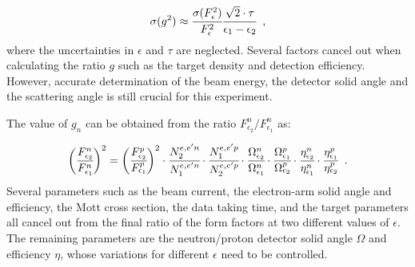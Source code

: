 \documentclass[11pt]{article}
\begin{document}
\begin{equation}
\sigma (g^2) \approx \cfrac{\sigma (F_{\epsilon}^2)}{F_{\epsilon}^2} \cfrac{\sqrt{2} \cdot \tau}{\epsilon_1 - \epsilon_2} \;\; ,
\end{equation}
where the uncertainties in $\epsilon$ and $\tau$ are neglected. Several factors cancel out when calculating the ratio $g$ such as the target density and detection efficiency. However, accurate determination of the beam energy, the detector solid angle and the scattering angle is still crucial for this experiment. \par
The value of $g_n$ can be obtained from the ratio $F_{\epsilon_2}^n/F_{\epsilon_1}^n$  as:

\begin{equation}
\bigg(\cfrac{F_{\epsilon_2}^n}{F_{\epsilon_1}^n}\bigg)^2 = \bigg(\cfrac{F_{\epsilon_2}^p}{F_{\epsilon_1}^p}\bigg)^2 \cdot \cfrac{N_2^{e,e'n}}{N_1^{e,e'n}} \cdot \cfrac{N_1^{e,e'p}}{N_2^{e,e'p}} \cdot \cfrac{\Omega_{\epsilon_2}^n}{\Omega_{\epsilon_1}^n}  \cdot \cfrac{\Omega_{\epsilon_1}^p}{\Omega_{\epsilon_2}^p} \cdot \cfrac{\eta_{\epsilon_2}^n}{\eta_{\epsilon_1}^n}  \cdot \cfrac{\eta_{\epsilon_1}^p}{\eta_{\epsilon_2}^p} \;\; .
\end{equation}
 Several parameters such as the beam current, the electron-arm solid angle and efficiency, the Mott cross section, the data taking time, and the target parameters all cancel out from the final ratio of the form factors at two different values of $\epsilon$. The remaining parameters are the neutron/proton detector solid angle $\Omega$ and efficiency $\eta$, whose variations for different $\epsilon$ need to be controlled.
\end{document}
